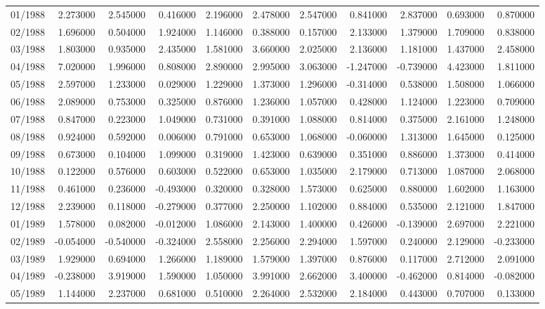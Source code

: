 \begin{tabular}{lrrrrrrrrrr}
01/1988 & 2.273000 & 2.545000 & 0.416000 & 2.196000 & 2.478000 & 2.547000 & 0.841000 & 2.837000 & 0.693000 & 0.870000 \\
02/1988 & 1.696000 & 0.504000 & 1.924000 & 1.146000 & 0.388000 & 0.157000 & 2.133000 & 1.379000 & 1.709000 & 0.838000 \\
03/1988 & 1.803000 & 0.935000 & 2.435000 & 1.581000 & 3.660000 & 2.025000 & 2.136000 & 1.181000 & 1.437000 & 2.458000 \\
04/1988 & 7.020000 & 1.996000 & 0.808000 & 2.890000 & 2.995000 & 3.063000 & -1.247000 & -0.739000 & 4.423000 & 1.811000 \\
05/1988 & 2.597000 & 1.233000 & 0.029000 & 1.229000 & 1.373000 & 1.296000 & -0.314000 & 0.538000 & 1.508000 & 1.066000 \\
06/1988 & 2.089000 & 0.753000 & 0.325000 & 0.876000 & 1.236000 & 1.057000 & 0.428000 & 1.124000 & 1.223000 & 0.709000 \\
07/1988 & 0.847000 & 0.223000 & 1.049000 & 0.731000 & 0.391000 & 1.088000 & 0.814000 & 0.375000 & 2.161000 & 1.248000 \\
08/1988 & 0.924000 & 0.592000 & 0.006000 & 0.791000 & 0.653000 & 1.068000 & -0.060000 & 1.313000 & 1.645000 & 0.125000 \\
09/1988 & 0.673000 & 0.104000 & 1.099000 & 0.319000 & 1.423000 & 0.639000 & 0.351000 & 0.886000 & 1.373000 & 0.414000 \\
10/1988 & 0.122000 & 0.576000 & 0.603000 & 0.522000 & 0.653000 & 1.035000 & 2.179000 & 0.713000 & 1.087000 & 2.068000 \\
11/1988 & 0.461000 & 0.236000 & -0.493000 & 0.320000 & 0.328000 & 1.573000 & 0.625000 & 0.880000 & 1.602000 & 1.163000 \\
12/1988 & 2.239000 & 0.118000 & -0.279000 & 0.377000 & 2.250000 & 1.102000 & 0.884000 & 0.535000 & 2.121000 & 1.847000 \\
01/1989 & 1.578000 & 0.082000 & -0.012000 & 1.086000 & 2.143000 & 1.400000 & 0.426000 & -0.139000 & 2.697000 & 2.221000 \\
02/1989 & -0.054000 & -0.540000 & -0.324000 & 2.558000 & 2.256000 & 2.294000 & 1.597000 & 0.240000 & 2.129000 & -0.233000 \\
03/1989 & 1.929000 & 0.694000 & 1.266000 & 1.189000 & 1.579000 & 1.397000 & 0.876000 & 0.117000 & 2.712000 & 2.091000 \\
04/1989 & -0.238000 & 3.919000 & 1.590000 & 1.050000 & 3.991000 & 2.662000 & 3.400000 & -0.462000 & 0.814000 & -0.082000 \\
05/1989 & 1.144000 & 2.237000 & 0.681000 & 0.510000 & 2.264000 & 2.532000 & 2.184000 & 0.443000 & 0.707000 & 0.133000 \\

\end{tabular}
